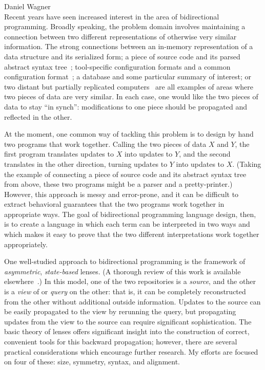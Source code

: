 \documentclass{article}
\begin{document}
{\noindent Daniel Wagner}\\[0ex]

Recent years have seen increased interest in the area of bidirectional
programming. Broadly speaking, the problem domain involves maintaining a
connection between two different representations of otherwise very similar
information. The strong connections between an in-memory representation of a
data structure and its serialized form; a piece of source code and its
parsed abstract syntax tree~\cite{rendel2010invertible}; tool-specific
configuration formats and a common configuration format~\cite{Augeas}; a
database and some particular summary of interest; or two distant but
partially replicated computers~\cite{pierce2004unison} are all examples of
areas where two pieces of data are very similar. In each case, one would
like the two pieces of data to stay ``in synch'': modifications to one piece
should be propagated and reflected in the other.

At the moment, one common way of tackling this problem is to design by hand
two programs that work together. Calling the two pieces of data $X$ and $Y$,
the first program translates updates to $X$ into updates to $Y$, and the
second translates in the other direction, turning updates to $Y$ into
updates to $X$. (Taking the example of connecting a piece of source code and
its abstract syntax tree from above, these two programs might be a parser
and a pretty-printer.) However, this approach is messy and error-prone, and
it can be difficult to extract behavioral guarantees that the two programs
work together in appropriate ways. The goal of bidirectional programming
language design, then, is to create a language in which each term can be
interpreted in two ways and which makes it easy to prove that the two
different interpretations work together appropriately.

One well-studied approach to bidirectional programming is the framework of
\emph{asymmetric}, \emph{state-based} lenses. (A thorough review of this
work is available elsewhere~\cite{FosterThesis}.) In this model, one of the
two repositories is a \emph{source}, and the other is a \emph{view} of or
\emph{query} on the other: that is, it can be completely reconstructed from
the other without additional outside information. Updates to the source can
be easily propagated to the view by rerunning the query, but propagating
updates from the view to the source can require significant sophistication.
The basic theory of lenses offers significant insight into the construction
of correct, convenient tools for this backward propagation; however, there
are several practical considerations which encourage further research. My
efforts are focused on four of these: size, symmetry, syntax, and alignment.
\end{document}

